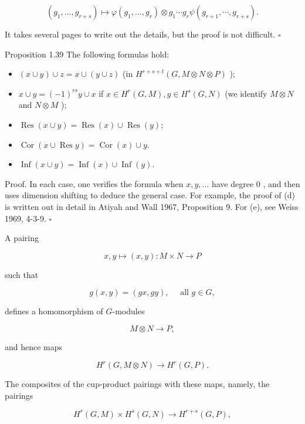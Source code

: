 \documentclass[10pt]{article}
\begin{document}
$$
\left(g_{1}, \ldots, g_{r+s}\right) \mapsto \varphi\left(g_{1}, \ldots, g_{r}\right) \otimes g_{1} \cdots g_{r} \psi\left(g_{r+1}, \cdots, g_{r+s}\right) .
$$

It takes several pages to write out the details, but the proof is not difficult. \(\square\)

Proposition 1.39 The following formulas hold:

\begin{itemize}
  \item[(a)] $(x \cup y) \cup z=x \cup(y \cup z)$ (in $H^{r+s+t}(G, M \otimes N \otimes P)$ );
  \item[(b)] $x \cup y=(-1)^{r s} y \cup x$ if $x \in H^{r}(G, M), y \in H^{s}(G, N)$ (we identify $M \otimes N$ and $N \otimes M$ );
  \item[(c)] $\operatorname{Res}(x \cup y)=\operatorname{Res}(x) \cup \operatorname{Res}(y)$;
\end{itemize}

\begin{itemize}
  \item[(d)] $\operatorname{Cor}(x \cup \operatorname{Res} y)=\operatorname{Cor}(x) \cup y$.
  \item[(e)] $\operatorname{Inf}(x \cup y)=\operatorname{Inf}(x) \cup \operatorname{Inf}(y)$.
\end{itemize}

Proof. In each case, one verifies the formula when $x, y, \ldots$ have degree 0 , and then uses dimension shifting to deduce the general case. For example, the proof of (d) is written out in detail in Atiyah and Wall 1967, Proposition 9. For (e), see Weiss 1969, 4-3-9. \(\square\)

A pairing


\begin{equation*}
x, y \mapsto(x, y): M \times N \rightarrow P \tag{18}
\end{equation*}


such that

$$
g(x, y)=(g x, g y), \quad \text { all } g \in G,
$$

defines a homomorphism of $G$-modules

$$
M \otimes N \rightarrow P,
$$

and hence maps

$$
H^{r}(G, M \otimes N) \rightarrow H^{r}(G, P) .
$$

The composites of the cup-product pairings with these maps, namely, the pairings

$$
H^{r}(G, M) \times H^{s}(G, N) \rightarrow H^{r+s}(G, P),
$$
\end{document}
